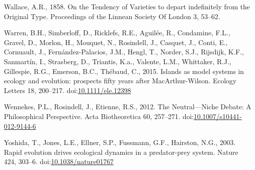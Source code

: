 \hypertarget{ref-Wallace1858}{}
Wallace, A.R., 1858. On the Tendency of Varieties to depart indefinitely
from the Original Type. Proceedings of the Linnean Society Of London 3,
53--62.

\hypertarget{ref-Warren2015}{}
Warren, B.H., Simberloff, D., Ricklefs, R.E., Aguilée, R., Condamine,
F.L., Gravel, D., Morlon, H., Mouquet, N., Rosindell, J., Casquet, J.,
Conti, E., Cornuault, J., Fernández-Palacios, J.M., Hengl, T., Norder,
S.J., Rijsdijk, K.F., Sanmartín, I., Strasberg, D., Triantis, K.a.,
Valente, L.M., Whittaker, R.J., Gillespie, R.G., Emerson, B.C., Thébaud,
C., 2015. Islands as model systems in ecology and evolution: prospects
fifty years after MacArthur-Wilson. Ecology Letters 18, 200--217.
doi:\href{https://doi.org/10.1111/ele.12398}{10.1111/ele.12398}

\hypertarget{ref-Wennekes2012}{}
Wennekes, P.L., Rosindell, J., Etienne, R.S., 2012. The Neutral---Niche
Debate: A Philosophical Perspective. Acta Biotheoretica 60, 257--271.
doi:\href{https://doi.org/10.1007/s10441-012-9144-6}{10.1007/s10441-012-9144-6}

\hypertarget{ref-Yoshida2003}{}
Yoshida, T., Jones, L.E., Ellner, S.P., Fussmann, G.F., Hairston, N.G.,
2003. Rapid evolution drives ecological dynamics in a predator-prey
system. Nature 424, 303--6.
doi:\href{https://doi.org/10.1038/nature01767}{10.1038/nature01767}
